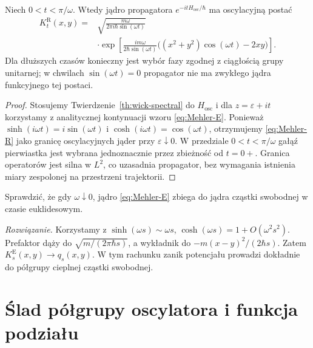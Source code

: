\begin{wniosek}
\label{cor:Mehler-real}
Niech $0<t<\pi/\omega$. Wtedy jądro propagatora
$e^{-itH_{\mathrm{osc}}/\hbar}$ ma oscylacyjną postać
\[
\begin{split}
 K_t^{\mathrm R}(x,y)
  ={}&\sqrt{\frac{m\omega}{2\pi i\hbar\sin(\omega t)}}\\
 &\cdot\exp\left[\frac{im\omega}{2\hbar\sin(\omega t)}
 \bigl((x^2+y^2)\cos(\omega t)-2xy\bigr)\right].
\end{split}
\tag{16.12}\label{eq:Mehler-R}
\]
Dla dłuższych czasów konieczny jest wybór fazy
zgodnej z ciągłością grupy unitarnej; w chwilach
$\sin(\omega t)=0$ propagator nie ma zwykłego jądra
funkcyjnego tej postaci.
\end{wniosek}
\begin{proof}
Stosujemy Twierdzenie~\ref{th:wick-spectral} do
$H_{\mathrm{osc}}$ i dla $z=\varepsilon+it$ korzystamy
z analitycznej kontynuacji wzoru \eqref{eq:Mehler-E}.
Ponieważ $\sinh(i\omega t)=i\sin(\omega t)$ i
$\cosh(i\omega t)=\cos(\omega t)$, otrzymujemy
\eqref{eq:Mehler-R} jako granicę oscylacyjnych jąder
przy $\varepsilon\downarrow0$. W przedziale
$0<t<\pi/\omega$ gałąź pierwiastka jest wybrana
jednoznacznie przez zbieżność od $t=0+$.
Granica operatorów jest silna w $L^2$, co uzasadnia
propagator, bez wymagania istnienia miary zespolonej
na przestrzeni trajektorii.
\end{proof}

\begin{zadanie}
Sprawdzić, że gdy $\omega\downarrow0$, jądro
\eqref{eq:Mehler-E} zbiega do jądra cząstki swobodnej
w czasie euklidesowym.

\emph{Rozwiązanie.} Korzystamy z
$\sinh(\omega s)\sim\omega s$,
$\cosh(\omega s)=1+O(\omega^2s^2)$.
Prefaktor dąży do $\sqrt{m/(2\pi\hbar s)}$,
a wykładnik do $-m(x-y)^2/(2\hbar s)$.
Zatem $K_s^{\mathrm E}(x,y)\to q_s(x,y)$.
W tym rachunku zanik potencjału prowadzi dokładnie do
półgrupy cieplnej cząstki swobodnej.
\end{zadanie}


\section{Ślad półgrupy oscylatora i funkcja podziału}

